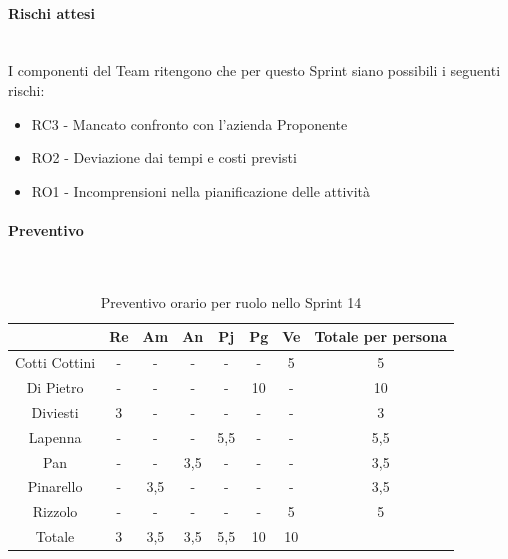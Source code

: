 \documentclass{article}
\begin{document}
                \paragraph{Rischi attesi}\mbox{}\\
                I componenti del Team ritengono che per questo Sprint siano possibili i seguenti rischi:
                \begin{itemize}
                    \item RC3 - Mancato confronto con l’azienda Proponente
                    \item RO2 - Deviazione dai tempi e costi previsti
                    \item RO1 - Incomprensioni nella pianificazione delle attività
                \end{itemize}

                \paragraph{Preventivo}\mbox{}\\
                \begin{table}[H]
                    \centering
                    \begin{tabular}{|c|c|c|c|c|c|c|c|}
                    \hline
                                  & Re  & Am  & An  & Pj  & Pg  & Ve  & Totale per persona \\ \hline
                    Cotti Cottini & -   & -   & -   & -   & -   & 5   & 5                  \\ \hline
                    Di Pietro     & -   & -   & -   & -   & 10  & -   & 10                 \\ \hline
                    Diviesti      & 3   & -   & -   & -   & -   & -   & 3                  \\ \hline
                    Lapenna       & -   & -   & -   & 5,5 & -   & -   & 5,5                \\ \hline
                    Pan           & -   & -   & 3,5 & -   & -   & -   & 3,5                \\ \hline
                    Pinarello     & -   & 3,5 & -   & -   & -   & -   & 3,5                \\ \hline
                    Rizzolo       & -   & -   & -   & -   & -   & 5   & 5                  \\ \hline
                    Totale        & 3   & 3,5 & 3,5 & 5,5 & 10  & 10  &                    \\ \hline
                    \end{tabular}
                    \caption{Preventivo orario per ruolo nello Sprint 14}
                \end{table}
\end{document}
